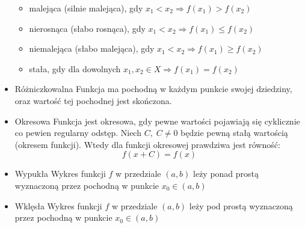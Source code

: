 \documentclass[14pt,a4paper]{extarticle}
\begin{document}
\begin{itemize}
\begin{itemize}
         \item malejąca (silnie malejąca), gdy $x_{1} < x_{2} \Rightarrow f(x_{1}) > f(x_{2})$
         \item nierosnąca (słabo rosnąca), gdy $x_{1} < x_{2} \Rightarrow f(x_{1}) \leq f(x_{2})$
         \item niemalejąca (słabo malejąca), gdy $x_{1} < x_{2} \Rightarrow f(x_{1}) \geq f(x_{2})$
         \item stała, gdy dla dowolnych $x_{1}, x_{2} \in X \Rightarrow f(x_{1}) = f(x_{2})$
      \end{itemize}
   \item Różniczkowalna\hfill\break
      Funkcja ma pochodną w każdym punkcie swojej dziedziny, oraz wartość tej pochodnej jest skończona.
   \item Okresowa\hfill\break
      Funkcja jest okresowa, gdy pewne wartości pojawiają się cyklicznie co pewien regularny odstęp.
      Niech $C, \;C \neq 0$ będzie pewną stałą wartością (okresem funkcji). Wtedy dla funkcji okresowej prawdziwa jest równość:
      $$f(x + C) = f(x)$$
   \item Wypukła\hfill\break
      Wykres funkcji $f$ w przedziale $(a, b)$ leży ponad prostą wyznaczoną przez pochodną w punkcie $x_{0} \in (a, b)$
   \item Wklęsła\hfill\break
      Wykres funkcji $f$ w przedziale $(a, b)$ leży pod prostą wyznaczoną przez pochodną w punkcie $x_{0} \in (a, b)$
\end{itemize}
\end{document}
